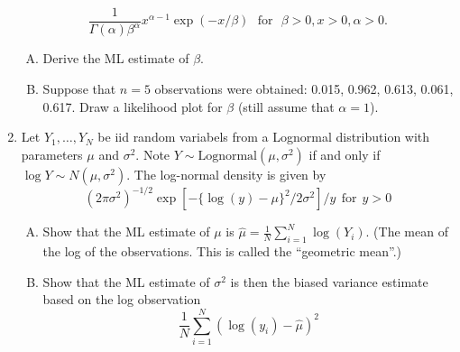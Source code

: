 \documentclass[12pt]{article}
\begin{document}
\begin{enumerate}[1.]
$$
\frac{1}{\Gamma(\alpha)\beta^\alpha} x^{\alpha -1} \exp(-x/\beta) ~~~\mbox{for}~~~\beta > 0, x>0, \alpha > 0.
$$
\begin{enumerate}[A.]
\item Derive the ML estimate of $\beta$.
\item Suppose that $n=5$ observations were obtained: 0.015, 0.962, 0.613, 0.061, 0.617. Draw
	a likelihood plot for $\beta$ (still assume that $\alpha = 1$).
\end{enumerate}
\item Let $Y_1,\ldots, Y_N$ be iid random variabels from a Lognormal distribution with parameters
	$\mu$ and $\sigma^2$. Note $Y \sim \mbox{Lognormal}(\mu,\sigma^2)$ if and only if
	$\log Y \sim N(\mu,\sigma^2)$. The log-normal density is given by
	$$
	(2\pi \sigma^2)^{-1/2} \exp[-\{\log(y) - \mu\}^2 / 2\sigma^2] / y ~~\mbox{for}~~ y > 0
	$$
	\begin{enumerate}[A.]
	\item Show that the ML estimate of $\mu$ is $\hat \mu = \frac{1}{N} \sum_{i=1}^N \log(Y_i)$. (The
	mean of the log of the observations. This is called the ``geometric mean''.)
	\item Show that the ML estimate of $\sigma^2$ is then the biased variance estimate based
	on the log observation
	$$
	\frac{1}{N}\sum_{i=1}^N (\log(y_i) - \hat \mu)^2
	$$
	\end{enumerate}
\end{enumerate}
\end{document}
